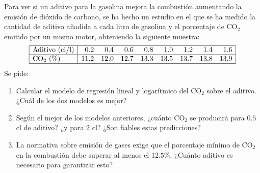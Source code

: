 {Para ver si un aditivo para la gasolina mejora la combustión aumentando la emisión de dióxido de carbono, se ha hecho un
estudio en el que se ha medido la cantidad de aditivo añadida a cada litro de gasolina y el porcentaje de CO$_2$ emitido
por un mismo motor, obteniendo la siguiente muestra: \[
\begin{array}{|l|rrrrrrrr|}
\hline
\mbox{Aditivo (cl/l)} &  0.2 &  0.4 &  0.6 &  0.8 &  1.0 &  1.2 &  1.4 &  1.6 \\
\hline
\mbox{CO$_2$ (\%)}         & 11.2 & 12.0 & 12.7 & 13.3 & 13.5 & 13.7 & 13.8 & 13.9 \\
\hline
\end{array}
\]
Se pide:
\begin{enumerate}
\item Calcular el modelo de regresión lineal y logarítmico del CO$_2$ sobre el aditivo.
¿Cuál de los dos modelos es mejor?
\item Según el mejor de los modelos anteriores, ¿cuánto CO$_2$ se producirá para $0.5$ cl de aditivo? ¿y para 2 cl?
¿Son fiables estas predicciones?
\item La normativa sobre emisión de gases exige que el porcentaje mínimo de CO$_2$ en la combustión debe superar al menos el $12.5\%$.
¿Cuánto aditivo es necesario para garantizar esto?
\end{enumerate}
}
{}
{}


